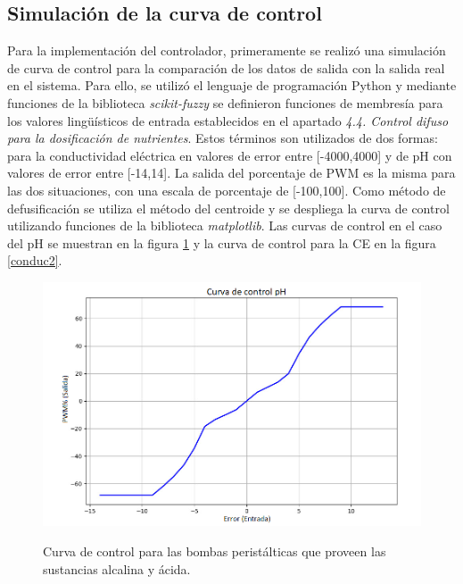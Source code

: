 \subsection{Simulación de la curva de control}
Para la implementación del controlador, primeramente se realizó una simulación de curva de control para la comparación de los datos de salida con la salida real en el sistema.  Para ello, se utilizó el lenguaje de programación Python y mediante funciones de la biblioteca \textit{scikit-fuzzy} se definieron funciones de membresía para los valores lingüísticos de entrada establecidos en el apartado \textit{ 4.4. Control difuso para la dosificación de nutrientes}. Estos términos son utilizados de dos formas: para la conductividad eléctrica en valores de error entre [-4000,4000] y de pH con valores de error entre [-14,14]. La salida del porcentaje de PWM es la misma para las dos situaciones, con una escala de porcentaje de [-100,100]. Como método de defusificación se utiliza el método del centroide y se despliega la curva de control utilizando funciones de la biblioteca \textit{matplotlib}. Las curvas de control en el caso del pH se muestran en la figura \ref{ph2} y la curva de control para la CE en la figura \ref{conduc2}.
\begin{figure}[H]
\centering
         \includegraphics[scale=0.6]{imgs/CurvaPH_Esp.png} \\
    \caption{Curva de control para las bombas peristálticas que proveen las sustancias alcalina y ácida.}\label{ph2}
\end{figure}
